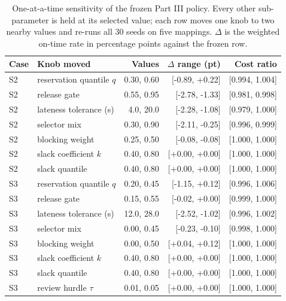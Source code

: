 ﻿\begin{table}[H]
\centering
\caption{One-at-a-time sensitivity of the frozen Part III policy. Every other sub-parameter is held at its selected value; each row moves one knob to two nearby values and re-runs all 30 seeds on five mappings. $\Delta$ is the weighted on-time rate in percentage points against the frozen row.}
\label{tab:p3-sens}
\footnotesize
\begin{tabular}{llrrr}
\toprule
Case & Knob moved & Values & $\Delta$ range (pt) & Cost ratio \\
\midrule
S2 & reservation quantile $q$ & 0.30, 0.60 & [-0.89, +0.22] & [0.994, 1.004] \\
S2 & release gate & 0.55, 0.95 & [-2.78, -1.33] & [0.981, 0.998] \\
S2 & lateness tolerance (s) & 4.0, 20.0 & [-2.28, -1.08] & [0.979, 1.000] \\
S2 & selector mix & 0.30, 0.90 & [-2.11, -0.25] & [0.996, 0.999] \\
S2 & blocking weight & 0.25, 0.50 & [-0.08, -0.08] & [1.000, 1.000] \\
S2 & slack coefficient $k$ & 0.40, 0.80 & [+0.00, +0.00] & [1.000, 1.000] \\
S2 & slack quantile & 0.40, 0.80 & [+0.00, +0.00] & [1.000, 1.000] \\
\midrule
S3 & reservation quantile $q$ & 0.20, 0.45 & [-1.15, +0.12] & [0.996, 1.006] \\
S3 & release gate & 0.15, 0.55 & [-0.02, +0.00] & [0.999, 1.000] \\
S3 & lateness tolerance (s) & 12.0, 28.0 & [-2.52, -1.02] & [0.996, 1.002] \\
S3 & selector mix & 0.00, 0.45 & [-0.23, -0.10] & [0.998, 1.000] \\
S3 & blocking weight & 0.00, 0.50 & [+0.04, +0.12] & [1.000, 1.000] \\
S3 & slack coefficient $k$ & 0.40, 0.80 & [+0.00, +0.00] & [1.000, 1.000] \\
S3 & slack quantile & 0.40, 0.80 & [+0.00, +0.00] & [1.000, 1.000] \\
S3 & review hurdle $\tau$ & 0.01, 0.05 & [+0.00, +0.00] & [1.000, 1.000] \\
\bottomrule
\end{tabular}
\end{table}

